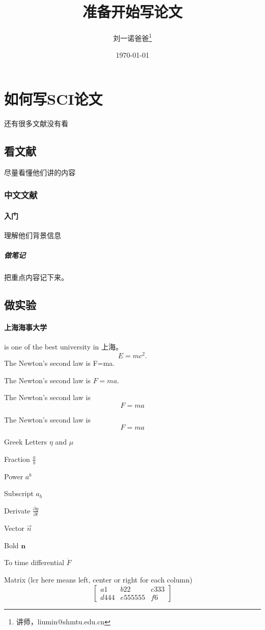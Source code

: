 \documentclass[UTF8]{ctexart}
\title{准备开始写论文}
\author{刘一诺爸爸\thanks{讲师，liumin@shmtu.edu.cn}}
\date{\today}
\begin{document}
\maketitle
\tableofcontents
\section{如何写SCI论文}
还有很多文献没有看
\subsection{看文献}
尽量看懂他们讲的内容
\subsubsection{中文文献}
\paragraph{入门}
理解他们背景信息
\subparagraph{做笔记}
{把重点内容记下来。}
\subsection{做实验}
\paragraph{上海海事大学} is one of the best university in 上海。
\begin{equation}
    E=mc^2.
\end{equation}
The Newton's second law is F=ma.

The Newton's second law is $F=ma$.

The Newton's second law is
$$F=ma$$

The Newton's second law is
\[F=ma\]

Greek Letters $\eta$ and $\mu$

Fraction $\frac{a}{b}$

Power $a^b$

Subscript $a_b$

Derivate $\frac{\partial y}{\partial t} $

Vector $\vec{n}$

Bold $\mathbf{n}$

To time differential $\dot{F}$

Matrix (lcr here means left, center or right for each column)
\[
    \left[
        \begin{array}{lcr}
            a1   & b22     & c333 \\
            d444 & e555555 & f6
        \end{array}
        \right]
\]
\end{document}
